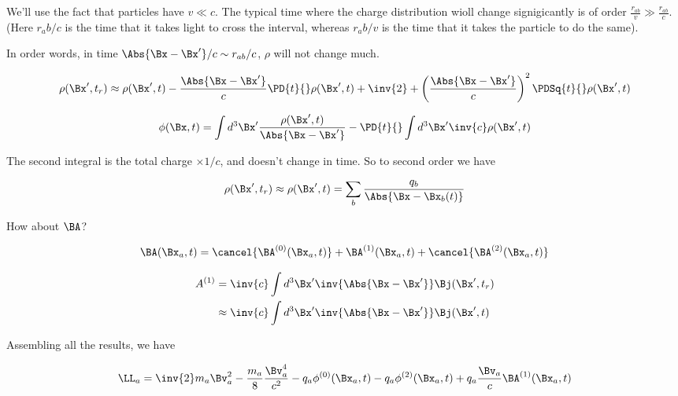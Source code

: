 We'll use the fact that particles have $v \ll c$.  The typical time where the charge distribution wioll change signigicantly is of order $\frac{r_{ab}}{v} \gg \frac{r_{ab}}{c}$.  (Here $r_ab/c$ is the time that it takes light to cross the interval, whereas $r_ab/v$ is the time that it takes the particle to do the same).

In order words, in time $\Abs{\Bx - \Bx'}/c \sim r_{ab}/c$, $\rho$ will not change much.

\begin{equation}\label{eqn:relativisticElectrodynamicsL25:n}
\rho(\Bx', t_r) \approx \rho(\Bx', t) 
- \frac{\Abs{\Bx - \Bx'}}{c} \PD{t}{} \rho(\Bx', t) + \inv{2} 
+ \left(\frac{\Abs{\Bx - \Bx'}}{c}\right)^2 \PDSq{t}{} \rho(\Bx', t) 
\end{equation}

\begin{equation}\label{eqn:relativisticElectrodynamicsL25:n}
\phi(\Bx, t) 
= \int d^3 \Bx' \frac{\rho(\Bx', t)}{\Abs{\Bx - \Bx'}} - \PD{t}{} \int d^3 \Bx' \inv{c} \rho(\Bx', t)
\end{equation}

The second integral is the total charge $\times 1/c$, and doesn't change in time.  So to second order we have

\begin{equation}\label{eqn:relativisticElectrodynamicsL25:n}
\rho(\Bx', t_r) \approx \rho(\Bx', t) = \sum_b \frac{q_b}{\Abs{\Bx - \Bx_b(t)}}
\end{equation}

How about $\BA$?

\begin{equation}\label{eqn:relativisticElectrodynamicsL25:n}
\BA(\Bx_a, t) = 
\cancel{\BA^{(0)}(\Bx_a, t)}
+\BA^{(1)}(\Bx_a, t)
+\cancel{\BA^{(2)}(\Bx_a, t)}
\end{equation}

\begin{align*}
A^{(1)} 
&= \inv{c} \int d^3 \Bx' \inv{\Abs{\Bx - \Bx'}} \Bj(\Bx', t_r)  \\
&\approx \inv{c} \int d^3 \Bx' \inv{\Abs{\Bx - \Bx'}} \Bj(\Bx', t)
\end{align*}

Assembling all the results, we have

\begin{equation}\label{eqn:relativisticElectrodynamicsL25:n}
\LL_a = \inv{2} m_a \Bv_a^2 - \frac{m_a}{8} \frac{\Bv_a^4}{c^2} - q_a \phi^{(0)}(\Bx_a, t) - q_a \phi^{(2)}(\Bx_a, t) + q_a \frac{\Bv_a}{c} \BA^{(1)}(\Bx_a, t)
\end{equation}

